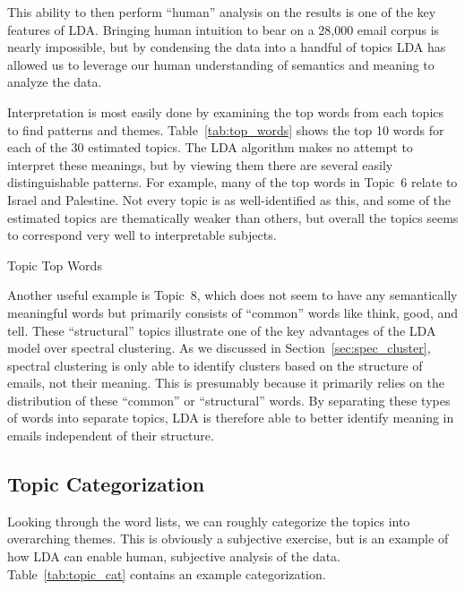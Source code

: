 \documentclass[12pt]{article}
\theoremstyle{definition}
\theoremstyle{algodesc}
\begin{document}
This ability to then perform ``human'' analysis on the results is one of the key features of LDA. Bringing human intuition to bear on a 28,000 email corpus is nearly impossible, but by condensing the data into a handful of topics LDA has allowed us to leverage our human understanding of semantics and meaning to analyze the data.

Interpretation is most easily done by examining the top words from each topics to find patterns and themes. Table~\ref{tab:top_words} shows the top 10 words for each of the 30 estimated topics. The LDA algorithm makes no attempt to interpret these meanings, but by viewing them there are several easily distinguishable patterns. For example, many of the top words in Topic~6 relate to Israel and Palestine. Not every topic is as well-identified as this, and some of the estimated topics are thematically weaker than others, but overall the topics seems to correspond very well to interpretable subjects.

\begin{table}[htb] \centering \scriptsize

\caption{Topic Top Words}
\label{tab:top_words}
\end{table}

Another useful example is Topic~8, which does not seem to have any semantically meaningful words but primarily consists of ``common'' words like think, good, and tell. These ``structural'' topics illustrate one of the key advantages of the LDA model over spectral clustering. As we discussed in Section~\ref{sec:spec_cluster}, spectral clustering is only able to identify clusters based on the structure of emails, not their meaning. This is presumably because it primarily relies on the distribution of these ``common'' or ``structural'' words. By separating these types of words into separate topics, LDA is therefore able to better identify meaning in emails independent of their structure.


\subsection{Topic Categorization}
Looking through the word lists, we can roughly categorize the topics into overarching themes. This is obviously a subjective exercise, but is an example of how LDA can enable human, subjective analysis of the data. Table~\ref{tab:topic_cat} contains an example categorization.
\end{document}
